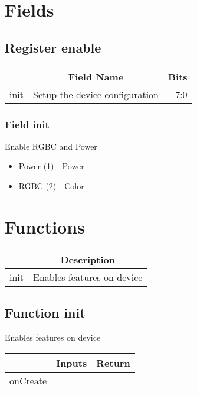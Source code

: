 \documentclass[a4paper,12pt,oneside,pdflatex,italian,final,twocolumn]{article}
\begin{document}
\raggedright

\section{Fields}



\raggedright

\subsection{Register enable}
\centering
\begin{tabular}{lcr}
\toprule
  & Field Name & Bits \\
\midrule
init & Setup the device configuration &
7:0
\\
\bottomrule

\end{tabular}


\raggedright

\subsubsection{Field init }

Enable RGBC and Power

\begin{itemize}
\item Power (1) - Power
\item RGBC (2) - Color
\end{itemize}




\raggedright

\section{Functions}

\centering
\begin{tabular}{lc}
\toprule
  & Description \\
\midrule
init & Enables features on device \\
\bottomrule
\end{tabular}


\raggedright
\subsection{Function init }
Enables features on device \\

\centering
\begin{tabular}{lcr}
\toprule
  & Inputs & Return \\
\midrule
onCreate &
&
\\
\bottomrule
\end{tabular}



\raggedright
\end{document}
